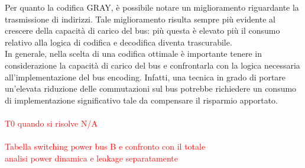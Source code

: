 \documentclass[11pt,  english, makeidx, a4paper, titlepage, oneside]{book}
\begin{document}
Per quanto la codifica GRAY, è possibile notare un miglioramento riguardante la trasmissione di indirizzi. Tale miglioramento risulta sempre più evidente al crescere della capacità di carico del bus: più questa è elevato più il consumo relativo alla logica di codifica e decodifica diventa trascurabile.
\\
In generale, nella scelta di una codifica ottimale è importante tenere in considerazione la capacità di carico del bus e confrontarla con la logica necessaria all'implementazione del bus encoding. Infatti, una tecnica in grado di portare un'elevata riduzione delle commutazioni sul bus potrebbe richiedere un consumo di implementazione significativo tale da compensare il risparmio apportato.
\\\\
\textcolor{red}{T0 quando si risolve N/A}
\\\\
\textcolor{red}{Tabella switching power bus B e confronto con il totale
\\
analisi power dinamica e leakage separatamente}
\end{document}
